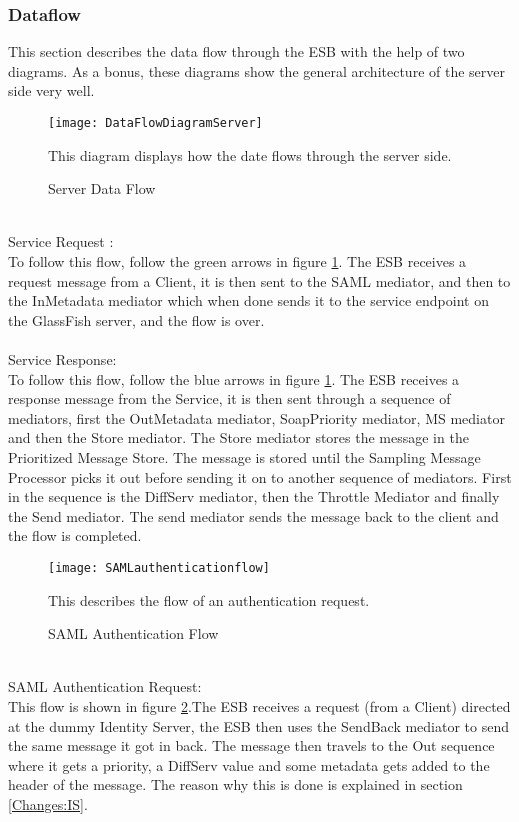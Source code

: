     \subsubsection{Dataflow}\label{Textual Server Dataflow} 
        This section describes the data flow through the ESB with the help of two diagrams. As a bonus, these diagrams show the general architecture of the server side very well.
\\
        \begin{figure}[h]
            \centering
            \texttt{[image: DataFlowDiagramServer]}
            \caption{Server Data Flow}
            This diagram displays how the date flows through the server side. 
            \label{fig:DataFlowDiagramServer}
        \end{figure}
\\
Service Request :\\
To follow this flow, follow the green arrows in figure \ref{fig:DataFlowDiagramServer}. The ESB receives a request message from a Client, it is then sent to the SAML mediator, and then to the InMetadata mediator which when done sends it to the service endpoint on the GlassFish server, and the flow is over.
\\\\
Service Response:\\
To follow this flow, follow the blue arrows in figure \ref{fig:DataFlowDiagramServer}. The ESB receives a response message from the Service, it is then sent through a sequence of mediators, first the OutMetadata mediator, SoapPriority mediator, MS mediator and then  the Store mediator. The Store mediator stores the message in the Prioritized Message Store. The message is stored until the Sampling Message Processor picks it out before sending it on to another sequence of mediators. First in the sequence is the DiffServ mediator, then the Throttle Mediator and finally the Send mediator. The send mediator sends the message back to the client and the flow is completed.
\\
    \begin{figure}[h]
        \centering
        \texttt{[image: SAMLauthenticationflow]}
        \caption{SAML Authentication Flow}
        This describes the flow of an authentication request. 
        \label{fig:SAMLauthenticationflow}
    \end{figure}
\\           
SAML Authentication Request:\\
This flow is shown in figure \ref{fig:SAMLauthenticationflow}.The ESB receives a request (from a Client) directed at the dummy Identity Server, the ESB then uses the SendBack mediator to send the same message it got in back. The message then travels to the Out sequence where it gets a priority, a DiffServ value and some metadata gets added to the header of the message. The reason why this is done is explained in section \ref{Changes:IS}.

